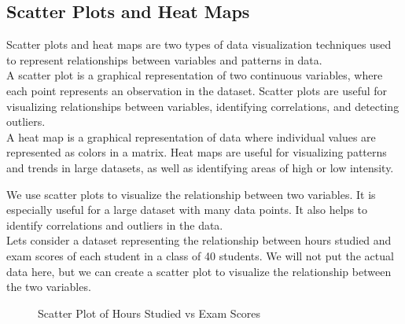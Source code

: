 \documentclass[openany]{book}
\begin{document}
\subsection{Scatter Plots and Heat Maps}
Scatter plots and heat maps are two types of data visualization techniques used to represent relationships between variables and patterns in data. \\
A scatter plot is a graphical representation of two continuous variables, where each point represents an observation in the dataset. Scatter plots are useful for visualizing relationships between variables, identifying correlations, and detecting outliers. \\
A heat map is a graphical representation of data where individual values are represented as colors in a matrix. Heat maps are useful for visualizing patterns and trends in large datasets, as well as identifying areas of high or low intensity. \\
\begin{example}
We use scatter plots to visualize the relationship between two variables. It is especially useful for a large dataset with many data points. It also helps to identify correlations and outliers in the data. \\
Lets consider a dataset representing the relationship between hours studied and exam scores of each student in a class of 40 students. We will not put the actual data here, but we can create a scatter plot to visualize the relationship between the two variables. \\
\begin{figure}[H]
    \centering
    \caption{Scatter Plot of Hours Studied vs Exam Scores}
\end{figure}
\end{example}
\end{document}
